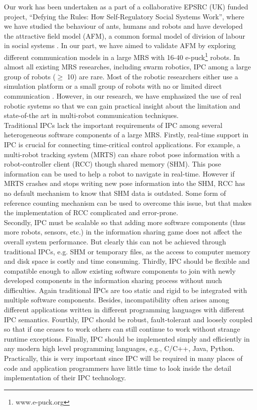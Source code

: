 \documentclass{ifacconf}
\begin{document}
Our work has been undertaken as a part of a collaborative EPSRC (UK) funded project, ``Defying the Rules: How Self-Regulatory Social Systems Work'', where we have studied the behaviour of ants, humans and robots and have developed the attractive field model (AFM), a common formal model of division of labour in social systems \citep{Arcaute+2008}. In our part, we have aimed to validate AFM by exploring different communication models in a large MRS with 16-40 e-puck\footnote{www.e-puck.org} robots. In almost all existing MRS researches, including swarm robotics, IPC among a large group of robots ($\geq$ 10) are rare. Most of the robotic researchers either use a simulation platform or a small group of robots with no or limited direct communication \citep[e.g. ][]{Labella2007}.   However, in our research, we have emphasized the use of real robotic systems so that we can gain practical insight about the limitation and state-of-the art in multi-robot communication techniques.\\
Traditional IPCs lack the important requirements of IPC among several heterogeneous software components of a large MRS. Firstly, real-time support in IPC is crucial for connecting time-critical control applications. For example, a multi-robot tracking system (MRTS) can share robot pose information with a robot-controller client (RCC) though shared memory (SHM). This pose information can be used to help  a robot to navigate in real-time. However if MRTS crashes and stops writing new pose information into the SHM, RCC has no default mechanism to know that SHM data is outdated. Some form of reference counting mechanism can be used to overcome this issue, but that makes the implementation of RCC complicated and error-prone.\\
Secondly, IPC must be scalable so that adding more software components (thus more robots, sensors, etc.) in the information sharing game does not affect the overall system performance. But clearly this can not be achieved through traditional IPCs, e.g. SHM or temporary files,  as the access to computer memory and disk space is costly and time consuming. Thirdly, IPC should be flexible and compatible enough to allow existing software components to join with newly developed components in the information  sharing process without much difficulties. Again traditional IPCs are too static and rigid to be integrated with multiple software components. Besides, incompatibility often arises among different applications written in different programming languages with different  IPC semantics. Fourthly, IPC should be robust, fault-tolerant and loosely coupled so that if one ceases to work others can still continue to work without strange runtime exceptions. Finally, IPC should be implemented simply and efficiently in any modern high level programming languages, e.g., C/C++, Java, Python. Practically, this is very important since IPC will be required in many places of code and application programmers have little time to look inside the detail implementation of their IPC technology.\\
\end{document}
